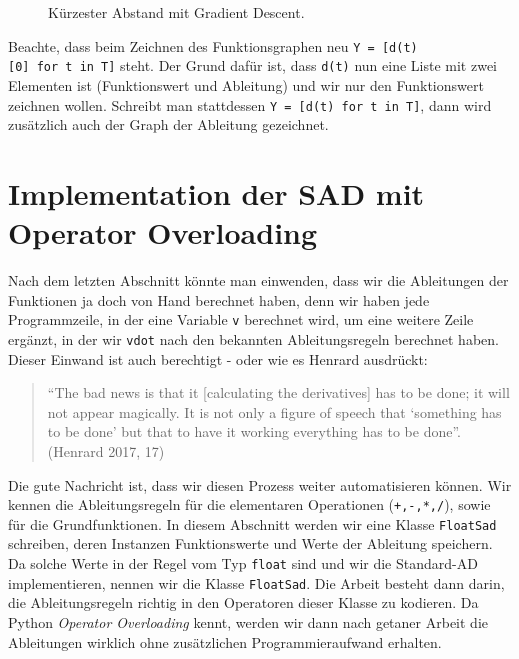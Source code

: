\documentclass[
  a4paper,
  DIV=11]{scrreprt}
\theoremstyle{definition}
\theoremstyle{definition}
\theoremstyle{remark}
\begin{document}
\begin{tcolorbox}
\begin{figure}[H]
{}

\caption{\label{fig-mindistproblemsolution}Kürzester Abstand mit
Gradient Descent.}

\end{figure}

Beachte, dass beim Zeichnen des Funktionsgraphen neu
\texttt{Y\ =\ {[}d(t){[}0{]}\ for\ t\ in\ T{]}} steht. Der Grund dafür
ist, dass \texttt{d(t)} nun eine Liste mit zwei Elementen ist
(Funktionswert und Ableitung) und wir nur den Funktionswert zeichnen
wollen. Schreibt man stattdessen
\texttt{Y\ =\ {[}d(t)\ for\ t\ in\ T{]}}, dann wird zusätzlich auch der
Graph der Ableitung gezeichnet.

\end{tcolorbox}

\hypertarget{sec-SadImplementationOperatorOverloading}{%
\section{Implementation der SAD mit Operator
Overloading}\label{sec-SadImplementationOperatorOverloading}}

Nach dem letzten Abschnitt könnte man einwenden, dass wir die
Ableitungen der Funktionen ja doch von Hand berechnet haben, denn wir
haben jede Programmzeile, in der eine Variable \texttt{v} berechnet
wird, um eine weitere Zeile ergänzt, in der wir \texttt{vdot} nach den
bekannten Ableitungsregeln berechnet haben. Dieser Einwand ist auch
berechtigt - oder wie es Henrard ausdrückt:

\begin{quote}
``The bad news is that it {[}calculating the derivatives{]} has to be
done; it will not appear magically. It is not only a figure of speech
that `something has to be done' but that to have it working everything
has to be done''. (Henrard 2017, 17)
\end{quote}

Die gute Nachricht ist, dass wir diesen Prozess weiter automatisieren
können. Wir kennen die Ableitungsregeln für die elementaren Operationen
(\texttt{+,-,*,/}), sowie für die Grundfunktionen. In diesem Abschnitt
werden wir eine Klasse \texttt{FloatSad} schreiben, deren Instanzen
Funktionswerte und Werte der Ableitung speichern. Da solche Werte in der
Regel vom Typ \texttt{float} sind und wir die Standard-AD
implementieren, nennen wir die Klasse \texttt{FloatSad}. Die Arbeit
besteht dann darin, die Ableitungsregeln richtig in den Operatoren
dieser Klasse zu kodieren. Da Python \emph{Operator Overloading} kennt,
werden wir dann nach getaner Arbeit die Ableitungen wirklich ohne
zusätzlichen Programmieraufwand erhalten.
\end{document}
